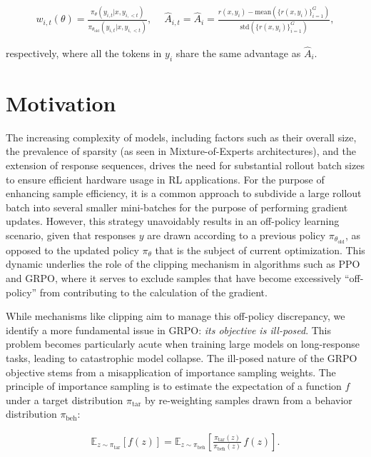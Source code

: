 \begin{align}
    w_{i,t}(\theta)=\frac{ \pi_{\theta} (y_{i,t} | x, y_{i,<t}) }{ \pi_{\theta_\text{old}} (y_{i,t} | x,y_{i,<t})},\quad\ 
    \widehat{A}_{i,t} = \widehat{A}_{i} = \frac{r(x, y_i) - \mathrm{mean} \left( \{ r(x, y_i) \}_{i=1}^G \right) }{ \mathrm{std} \left( \{ r(x, y_i) \}_{i=1}^G \right) },
\end{align}

respectively, where all the tokens in $y_i$ share the same advantage as $\widehat{A}_{i}$.

\section{Motivation}
\label{sec:motivation}

The increasing complexity of models, including factors such as their overall size, the prevalence of sparsity (as seen in Mixture-of-Experts architectures), and the extension of response sequences, drives the need for substantial rollout batch sizes to ensure efficient hardware usage in RL applications. For the purpose of enhancing sample efficiency, it is a common approach to subdivide a large rollout batch into several smaller mini-batches for the purpose of performing gradient updates. However, this strategy unavoidably results in an off-policy learning scenario, given that responses $y$ are drawn according to a previous policy $\pi_{\theta_\text{old}}$, as opposed to the updated policy $\pi_\theta$ that is the subject of current optimization. This dynamic underlies the role of the clipping mechanism in algorithms such as PPO and GRPO, where it serves to exclude samples that have become excessively ``off-policy'' from contributing to the calculation of the gradient.

While mechanisms like clipping aim to manage this off-policy discrepancy, we identify a more fundamental issue in GRPO: \textit{its objective is ill-posed}. This problem becomes particularly acute when training large models on long-response tasks, leading to catastrophic model collapse. The ill-posed nature of the GRPO objective stems from a misapplication of importance sampling weights. The principle of importance sampling is to estimate the expectation of a function $f$ under a target distribution $\pi_\text{tar}$ by re-weighting samples drawn from a behavior distribution $\pi_\text{beh}$:

\begin{align}
\mathbb{E}_{z \sim \pi_\text{tar}} \left[ f(z) \right] = \mathbb{E}_{z \sim \pi_\text{beh}} \left[ \frac{ \pi_\text{tar} (z) }{ \pi_\text{beh} (z)} \, f(z) \right].
\end{align}

